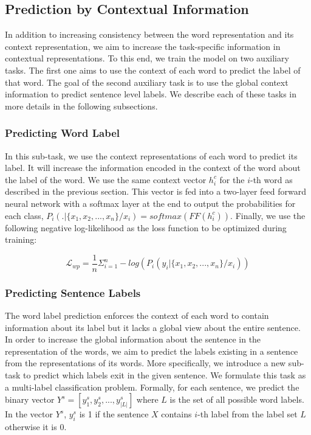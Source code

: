 \documentclass[11pt,a4paper]{article}
\begin{document}
\subsection{Prediction by Contextual Information}
In addition to increasing consistency between the word representation and its context representation, we aim to increase the task-specific information in contextual representations. To this end, we train the model on two auxiliary tasks. The first one aims to use the context of each word to predict the label of that word. The goal of the second auxiliary task is to use the global context information to predict sentence level labels. We describe each of these tasks in more details in the following subsections.





\subsubsection*{Predicting Word Label}
In this sub-task, we use the context representations of each word to predict its label. It will increase the information encoded in the context of the word about the label of the word. We use the same context vector $h^c_i$ for the $i$-th word as described in the previous section. This vector is fed into a two-layer feed forward neural network with a softmax layer at the end to output the probabilities for each class, $P_i(.|\{x_1,x_2,...,x_n\}/x_i) = softmax(FF(h^c_i))$. Finally, we use the following negative log-likelihood as the loss function to be optimized during training:

\begin{equation}
    \mathcal{L}_{wp} = \frac{1}{n}\Sigma_{i=1}^{n} -log( P_i(y_i|\{x_1,x_2,...,x_n\}/x_i))
\end{equation}





\subsubsection*{Predicting Sentence Labels}
The word label prediction enforces the context of each word to contain information about its label but it lacks a global view about the entire sentence. In order to increase the global information about the sentence in the representation of the words, we aim to predict the labels existing in a sentence from the representations of its words. More specifically, we introduce a new sub-task to predict which labels exit in the given sentence. We formulate this task as a multi-label classification problem. Formally, for each sentence, we predict the binary vector $Y^s=[y^s_1,y^s_2,...,y^s_{|L|}]$ where $L$ is the set of all possible word labels. In the vector $Y^s$, $y^s_i$ is 1 if the sentence $X$ contains $i$-th label from the label set $L$ otherwise it is 0.
\end{document}
